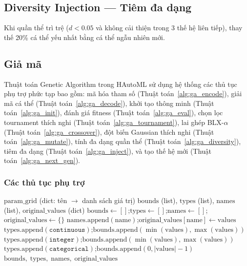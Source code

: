 \documentclass[12pt,a4paper]{article}
\begin{document}
\subsection{Diversity Injection --- Tiêm đa dạng}

Khi quần thể trì trệ ($d < 0.05$ và không cải thiện trong 3 thế hệ liên tiếp),
thay thế 20\% cá thể yếu nhất bằng cá thể ngẫu nhiên mới.

\subsection{Giả mã}

Thuật toán Genetic Algorithm trong HAutoML sử dụng hệ thống các thủ tục phụ trợ phức tạp bao gồm:
mã hóa tham số (Thuật toán~\ref{alg:ga_encode}),
giải mã cá thể (Thuật toán~\ref{alg:ga_decode}),
khởi tạo thông minh (Thuật toán~\ref{alg:ga_init}),
đánh giá fitness (Thuật toán~\ref{alg:ga_eval}),
chọn lọc tournament thích nghi (Thuật toán~\ref{alg:ga_tournament}),
lai ghép BLX-$\alpha$ (Thuật toán~\ref{alg:ga_crossover}),
đột biến Gaussian thích nghi (Thuật toán~\ref{alg:ga_mutate}),
tính đa dạng quần thể (Thuật toán~\ref{alg:ga_diversity}),
tiêm đa dạng (Thuật toán~\ref{alg:ga_inject}),
và tạo thế hệ mới (Thuật toán~\ref{alg:ga_next_gen}).

\subsubsection{Các thủ tục phụ trợ}

\begin{algorithm}[H]
\caption{Mã hóa lưới tham số (\textsc{EncodeParameters})}
\label{alg:ga_encode}
\begin{algorithmic}[1]
\Require $\text{param\_grid}$ (dict: tên $\rightarrow$ danh sách giá trị)
\Ensure $\text{bounds}$ (list), $\text{types}$ (list), $\text{names}$ (list), $\text{original\_values}$ (dict)
\State $\text{bounds} \gets []$;\quad $\text{types} \gets []$;\quad $\text{names} \gets []$;\quad $\text{original\_values} \gets \{\}$
    \State $\text{names}.\text{append}(\text{name})$;\quad $\text{original\_values}[\text{name}] \gets \text{values}$
        \State $\text{types}.\text{append}(\texttt{continuous})$;\quad $\text{bounds}.\text{append}(\min(\text{values}), \max(\text{values}))$
        \State $\text{types}.\text{append}(\texttt{integer})$;\quad $\text{bounds}.\text{append}(\min(\text{values}), \max(\text{values}))$
    \Else
        \State $\text{types}.\text{append}(\texttt{categorical})$;\quad $\text{bounds}.\text{append}(0, |\text{values}| - 1)$
    \EndIf
\EndFor
\State \Return $\text{bounds},\; \text{types},\; \text{names},\; \text{original\_values}$
\end{algorithmic}
\end{algorithm}
\end{document}
